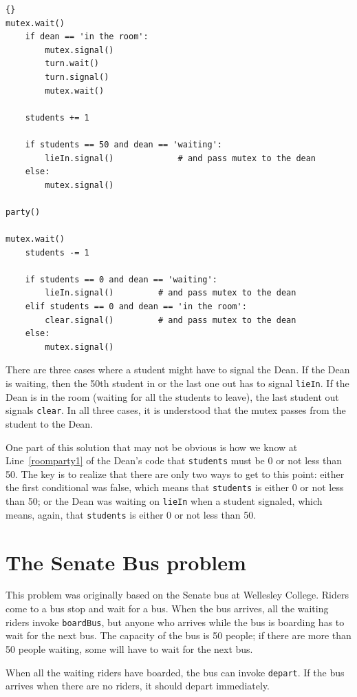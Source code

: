 \documentclass{book}
\newcommand{\clearemptydoublepage}{\newpage\cleardoublepage}
\begin{document}
\newpage
\begin{lstlisting}[title={Room party solution (student)}]{}
mutex.wait()
    if dean == 'in the room':
        mutex.signal()
        turn.wait()
        turn.signal()
        mutex.wait()

    students += 1

    if students == 50 and dean == 'waiting':
        lieIn.signal()             # and pass mutex to the dean
    else:
        mutex.signal()

party()

mutex.wait()
    students -= 1

    if students == 0 and dean == 'waiting':
        lieIn.signal()         # and pass mutex to the dean
    elif students == 0 and dean == 'in the room':
        clear.signal()         # and pass mutex to the dean
    else:
        mutex.signal()
\end{lstlisting}

There are three cases where a student might have to signal the Dean.
If the Dean is waiting, then the 50th student in or the last one out
has to signal {\tt lieIn}.  If the Dean is in the room (waiting for
all the students to leave), the last student out signals {\tt clear}.
In all three cases, it is understood that the mutex passes from the
student to the Dean.

One part of this solution that may not be obvious is how we know at
Line~\ref{roomparty1} of the Dean's code that {\tt students} must be 0
or not less than 50.  The key is to realize that there are only two
ways to get to this point: either the first conditional was false,
which means that {\tt students} is either 0 or not less than 50; or
the Dean was waiting on {\tt lieIn} when a student signaled, which
means, again, that {\tt students} is either 0 or not less than 50.


\clearemptydoublepage
\section{The Senate Bus problem}

This problem was originally based on the Senate bus at Wellesley
College.  Riders come to a bus stop and wait for a bus.  When the bus
arrives, all the waiting riders invoke {\tt boardBus}, but anyone who
arrives while the bus is boarding has to wait for the next bus.  The
capacity of the bus is 50 people; if there are more than 50 people
waiting, some will have to wait for the next bus.

When all the waiting riders have boarded,
the bus can invoke {\tt depart}.  If the bus arrives when there
are no riders, it should depart immediately.
\end{document}

